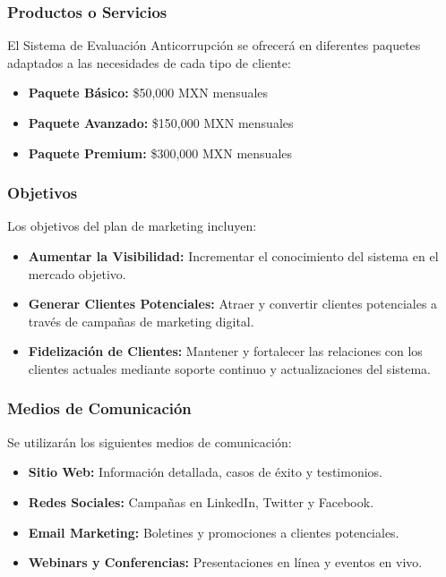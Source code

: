 \documentclass[a4paper,12pt]{article}
\begin{document}
\subsubsection{Productos o Servicios}
El Sistema de Evaluación Anticorrupción se ofrecerá en diferentes paquetes adaptados a las necesidades de cada tipo de cliente:

\begin{itemize}
    \item \textbf{Paquete Básico:} \$50,000 MXN mensuales
    \item \textbf{Paquete Avanzado:} \$150,000 MXN mensuales
    \item \textbf{Paquete Premium:} \$300,000 MXN mensuales
\end{itemize}

\subsubsection{Objetivos}
Los objetivos del plan de marketing incluyen:

\begin{itemize}
    \item \textbf{Aumentar la Visibilidad:} Incrementar el conocimiento del sistema en el mercado objetivo.
    \item \textbf{Generar Clientes Potenciales:} Atraer y convertir clientes potenciales a través de campañas de marketing digital.
    \item \textbf{Fidelización de Clientes:} Mantener y fortalecer las relaciones con los clientes actuales mediante soporte continuo y actualizaciones del sistema.
\end{itemize}

\subsubsection{Medios de Comunicación}
Se utilizarán los siguientes medios de comunicación:

\begin{itemize}
    \item \textbf{Sitio Web:} Información detallada, casos de éxito y testimonios.
    \item \textbf{Redes Sociales:} Campañas en LinkedIn, Twitter y Facebook.
    \item \textbf{Email Marketing:} Boletines y promociones a clientes potenciales.
    \item \textbf{Webinars y Conferencias:} Presentaciones en línea y eventos en vivo.
\end{itemize}
\end{document}
